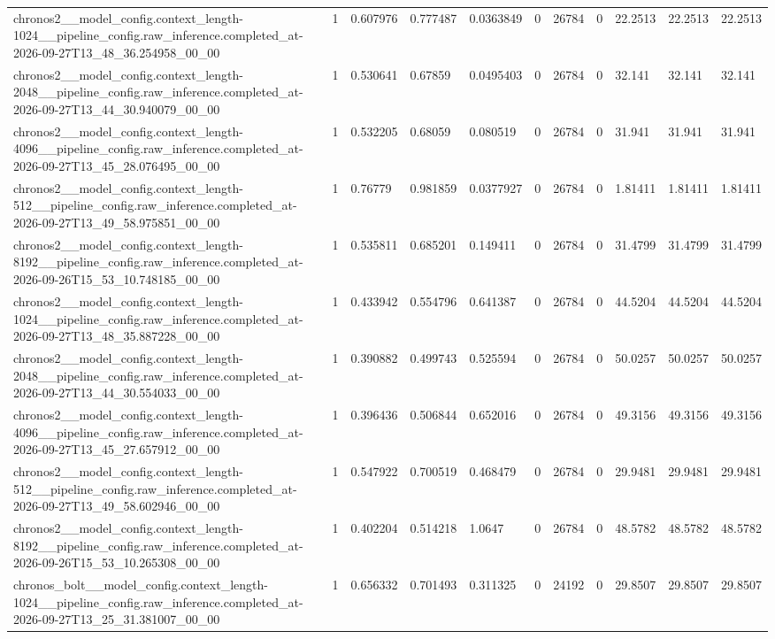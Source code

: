 \begin{tabular}{lllllllllll}
chronos2\_\_model\_config.context\_length-1024\_\_pipeline\_config.raw\_inference.completed\_at-2026-09-27T13\_48\_36.254958\_00\_00 & 1 & 0.607976 & 0.777487 & 0.0363849 & 0 & 26784 & 0 & 22.2513 & 22.2513 & 22.2513 \\
chronos2\_\_model\_config.context\_length-2048\_\_pipeline\_config.raw\_inference.completed\_at-2026-09-27T13\_44\_30.940079\_00\_00 & 1 & 0.530641 & 0.67859 & 0.0495403 & 0 & 26784 & 0 & 32.141 & 32.141 & 32.141 \\
chronos2\_\_model\_config.context\_length-4096\_\_pipeline\_config.raw\_inference.completed\_at-2026-09-27T13\_45\_28.076495\_00\_00 & 1 & 0.532205 & 0.68059 & 0.080519 & 0 & 26784 & 0 & 31.941 & 31.941 & 31.941 \\
chronos2\_\_model\_config.context\_length-512\_\_pipeline\_config.raw\_inference.completed\_at-2026-09-27T13\_49\_58.975851\_00\_00 & 1 & 0.76779 & 0.981859 & 0.0377927 & 0 & 26784 & 0 & 1.81411 & 1.81411 & 1.81411 \\
chronos2\_\_model\_config.context\_length-8192\_\_pipeline\_config.raw\_inference.completed\_at-2026-09-26T15\_53\_10.748185\_00\_00 & 1 & 0.535811 & 0.685201 & 0.149411 & 0 & 26784 & 0 & 31.4799 & 31.4799 & 31.4799 \\
chronos2\_\_model\_config.context\_length-1024\_\_pipeline\_config.raw\_inference.completed\_at-2026-09-27T13\_48\_35.887228\_00\_00 & 1 & 0.433942 & 0.554796 & 0.641387 & 0 & 26784 & 0 & 44.5204 & 44.5204 & 44.5204 \\
chronos2\_\_model\_config.context\_length-2048\_\_pipeline\_config.raw\_inference.completed\_at-2026-09-27T13\_44\_30.554033\_00\_00 & 1 & 0.390882 & 0.499743 & 0.525594 & 0 & 26784 & 0 & 50.0257 & 50.0257 & 50.0257 \\
chronos2\_\_model\_config.context\_length-4096\_\_pipeline\_config.raw\_inference.completed\_at-2026-09-27T13\_45\_27.657912\_00\_00 & 1 & 0.396436 & 0.506844 & 0.652016 & 0 & 26784 & 0 & 49.3156 & 49.3156 & 49.3156 \\
chronos2\_\_model\_config.context\_length-512\_\_pipeline\_config.raw\_inference.completed\_at-2026-09-27T13\_49\_58.602946\_00\_00 & 1 & 0.547922 & 0.700519 & 0.468479 & 0 & 26784 & 0 & 29.9481 & 29.9481 & 29.9481 \\
chronos2\_\_model\_config.context\_length-8192\_\_pipeline\_config.raw\_inference.completed\_at-2026-09-26T15\_53\_10.265308\_00\_00 & 1 & 0.402204 & 0.514218 & 1.0647 & 0 & 26784 & 0 & 48.5782 & 48.5782 & 48.5782 \\
chronos\_bolt\_\_model\_config.context\_length-1024\_\_pipeline\_config.raw\_inference.completed\_at-2026-09-27T13\_25\_31.381007\_00\_00 & 1 & 0.656332 & 0.701493 & 0.311325 & 0 & 24192 & 0 & 29.8507 & 29.8507 & 29.8507 \\

\end{tabular}
